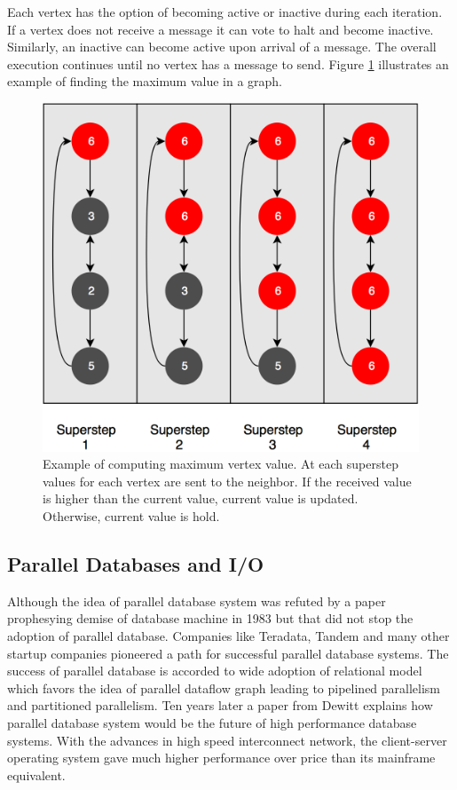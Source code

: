 \documentclass[runningheads,a4paper]{llncs}
\begin{document}
{Each vertex has the option of becoming active or inactive during each iteration. If a vertex does not receive a message it can vote to halt and become inactive. Similarly, an inactive can become active upon arrival of a message. The overall execution continues until no vertex has a message to send. Figure \ref{fig:max_super} illustrates an example of finding the maximum value in a graph.
\begin{figure}[!ht]
	\includegraphics[scale=0.23]{./images/graph_superstep.png}
	\centering
	\caption{Example of computing maximum vertex value. At each superstep values for each vertex are sent to the neighbor. If the received value is higher than the current value, current value is updated. Otherwise, current value is hold\cite{sakr2013processing}.}
	\label{fig:max_super}
\end{figure}

\subsection{Parallel Databases and I/O}
Although the idea of parallel database system was refuted by a paper prophesying demise of database machine in 1983 but that did not stop the adoption of parallel database. Companies like Teradata, Tandem and many other startup companies pioneered a path for successful parallel database systems. The success of parallel database is accorded to wide adoption of relational model which favors the idea of parallel dataflow graph leading to pipelined parallelism and partitioned parallelism. Ten years later a paper from Dewitt explains how parallel database system would be the future of high performance database systems. With the advances in high speed interconnect network, the client-server operating system gave much higher performance over price than its mainframe equivalent.\\

}
\end{document}
